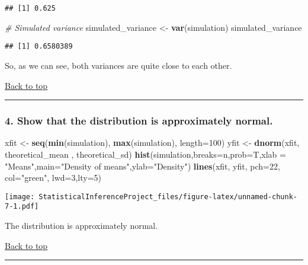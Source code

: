 \documentclass[]{article}
\newenvironment{Shaded}{\begin{snugshade}}{\end{snugshade}}
\newcommand{\KeywordTok}[1]{\textcolor[rgb]{0.13,0.29,0.53}{\textbf{{#1}}}}
\newcommand{\DataTypeTok}[1]{\textcolor[rgb]{0.13,0.29,0.53}{{#1}}}
\newcommand{\DecValTok}[1]{\textcolor[rgb]{0.00,0.00,0.81}{{#1}}}
\newcommand{\StringTok}[1]{\textcolor[rgb]{0.31,0.60,0.02}{{#1}}}
\newcommand{\CommentTok}[1]{\textcolor[rgb]{0.56,0.35,0.01}{\textit{{#1}}}}
\newcommand{\NormalTok}[1]{{#1}}
\begin{document}
\begin{verbatim}
## [1] 0.625
\end{verbatim}

\begin{Shaded}
\begin{Highlighting}[]
\CommentTok{# Simulated variance}
\NormalTok{simulated_variance  <-}\StringTok{ }\KeywordTok{var}\NormalTok{(simulation)}
\NormalTok{simulated_variance}
\end{Highlighting}
\end{Shaded}

\begin{verbatim}
## [1] 0.6580389
\end{verbatim}

So, as we can see, both variances are quite close to each other.

\protect\hyperlink{top}{Back to top}

\begin{center}\rule{0.5\linewidth}{\linethickness}\end{center}

\subsubsection{4. Show that the distribution is approximately
normal.}\label{show-that-the-distribution-is-approximately-normal.}

\begin{Shaded}
\begin{Highlighting}[]
\NormalTok{xfit <-}\StringTok{ }\KeywordTok{seq}\NormalTok{(}\KeywordTok{min}\NormalTok{(simulation), }\KeywordTok{max}\NormalTok{(simulation), }\DataTypeTok{length=}\DecValTok{100}\NormalTok{)}
\NormalTok{yfit <-}\StringTok{ }\KeywordTok{dnorm}\NormalTok{(xfit, theoretical_mean , theoretical_sd)}
\KeywordTok{hist}\NormalTok{(simulation,}\DataTypeTok{breaks=}\NormalTok{n,}\DataTypeTok{prob=}\NormalTok{T,}\DataTypeTok{xlab =} \StringTok{"Means"}\NormalTok{,}\DataTypeTok{main=}\StringTok{"Density of means"}\NormalTok{,}\DataTypeTok{ylab=}\StringTok{"Density"}\NormalTok{)}
\KeywordTok{lines}\NormalTok{(xfit, yfit, }\DataTypeTok{pch=}\DecValTok{22}\NormalTok{, }\DataTypeTok{col=}\StringTok{"green"}\NormalTok{, }\DataTypeTok{lwd=}\DecValTok{3}\NormalTok{,}\DataTypeTok{lty=}\DecValTok{5}\NormalTok{)}
\end{Highlighting}
\end{Shaded}

\texttt{[image: StatisticalInferenceProject\_files/figure-latex/unnamed-chunk-7-1.pdf]}

The distribution is approximately normal.

\protect\hyperlink{top}{Back to top}

\begin{center}\rule{0.5\linewidth}{\linethickness}\end{center}
\end{document}
